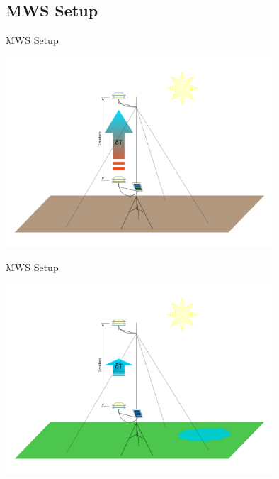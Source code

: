 \documentclass[aspectratio=169,unknownkeysallowed,xcolor=dvipsnames,beamer]{beamer} %
\begin{document}
\subsection{MWS Setup}
\begin{frame}[fragile]{MWS Setup}

\begin{center}
 \includegraphics[width=10cm]{MWS_v1_deltaT_sketch_hot}
\end{center}

\end{frame}

\begin{frame}[fragile]{MWS Setup}

\begin{center}
 \includegraphics[width=10cm]{MWS_v1_deltaT_sketch_cold}
\end{center}

\end{frame}

{
\begin{frame}[plain]
\end{frame}}
\end{document}
